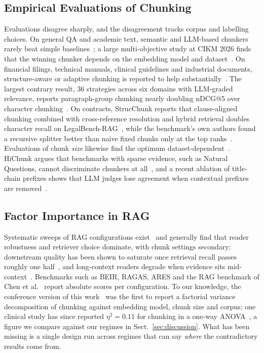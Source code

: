 \documentclass[runningheads]{llncs}
\begin{document}
\subsection{Empirical Evaluations of Chunking}
Evaluations disagree sharply, and the disagreement tracks corpus and labelling choices. On general QA and academic text, semantic and LLM-based chunkers rarely beat simple baselines~\cite{qu2025semantic,bennani2026systematic,kreileder2026academic,caspari2026complex,li2025enhancing}; a large multi-objective study at CIKM 2026 finds that the winning chunker depends on the embedding model and dataset~\cite{caspari2026complex}. On financial filings, technical manuals, clinical guidelines and industrial documents, structure-aware or adaptive chunking is reported to help substantially~\cite{jimenoyepes2024financial,taiwo2026oilgas,gomezcabello2025clinical,demoura2026adaptive}. The largest contrary result, 36 strategies across six domains with LLM-graded relevance, reports paragraph-group chunking nearly doubling nDCG@5 over character chunking~\cite{shaukat2026systematic}. On contracts, StrucChunk reports that clause-aligned chunking combined with cross-reference resolution and hybrid retrieval doubles character recall on LegalBench-RAG~\cite{singh2026strucchunk}, while the benchmark's own authors found a recursive splitter better than naive fixed chunks only at the top ranks~\cite{pipitone2024legalbenchrag}. Evaluations of chunk \emph{size} likewise find the optimum dataset-dependent~\cite{bhat2025chunksize,smith2024chroma}. HiChunk argues that benchmarks with sparse evidence, such as Natural Questions, cannot discriminate chunkers at all~\cite{lu2025hichunk}, and a recent ablation of title-chain prefixes shows that LLM judges lose agreement when contextual prefixes are removed~\cite{yang2026titlechain}.

\subsection{Factor Importance in RAG}
Systematic sweeps of RAG configurations exist~\cite{wang2024bestpractices,li2025enhancing,hsia2025ragged} and generally find that reader robustness and retriever choice dominate, with chunk settings secondary; downstream quality has been shown to saturate once retrieval recall passes roughly one half~\cite{leto2024optimal}, and long-context readers degrade when evidence sits mid-context~\cite{liu2024lost}. Benchmarks such as BEIR, RAGAS, ARES and the RAG benchmark of Chen et al.~\cite{thakur2021beir,es2024ragas,saadfalcon2024ares,chen2024benchmarking} report absolute scores per configuration. To our knowledge, the conference version of this work~\cite{chauhan2026chunking} was the first to report a factorial variance decomposition of chunking against embedding model, chunk size and corpus; one clinical study has since reported $\eta^2 = 0.11$ for chunking in a one-way ANOVA~\cite{gomezcabello2025clinical}, a figure we compare against our regimes in Sect.~\ref{sec:discussion}. What has been missing is a single design run across regimes that can say \emph{where} the contradictory results come from.
\end{document}
